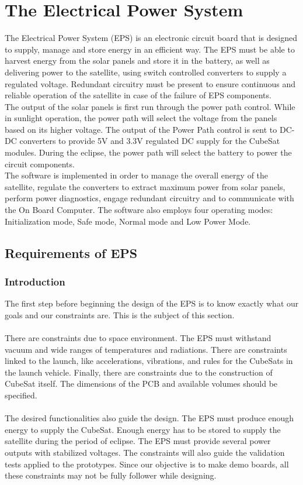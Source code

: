 \justifying
\chapter{The Electrical Power System}
The Electrical Power System (EPS) is an electronic circuit board that is designed
to supply, manage and store energy in an efficient way. The EPS must be
able to harvest energy from the solar panels and store it in the battery, as well as
delivering power to the satellite, using switch controlled converters to supply a
regulated voltage. Redundant circuitry must be present to ensure continuous and reliable operation of the satellite in case of the failure of EPS components.
\\
The output of the solar panels is first run through the power path control. While in
sunlight operation, the power path will select the voltage from the panels based on
its higher voltage. The output of the Power Path control is sent to DC-DC converters to provide 5V and 3.3V regulated DC supply for the CubeSat modules. During the eclipse, the power path will select the battery to power the circuit components.
\\
The software is implemented in order to manage the overall energy of the satellite,
regulate the converters to extract maximum power from solar panels, perform
power diagnostics, engage redundant circuitry and to communicate with the On
Board Computer. The software also employs four operating modes: Initialization
mode, Safe mode, Normal mode and Low Power Mode.
\\
\section{Requirements of EPS}

\subsection{Introduction} 

The first step before beginning the design of the EPS is to know exactly what our goals and our constraints are. This is the subject of this section.
\\ \\
There are constraints due to space environment. The EPS must withstand vacuum and wide ranges of temperatures and radiations. There are constraints linked to the launch, like accelerations, vibrations, and rules for the CubeSats in the launch vehicle. Finally, there are constraints due to the construction of CubeSat itself. The dimensions of the PCB and available volumes should be specified. 
\\ \\
The desired functionalities also guide the design. The EPS must produce enough energy to supply the CubeSat. Enough energy has to be stored to supply the satellite during the period of eclipse. The EPS must provide several power outputs with stabilized voltages. The constraints will also guide the validation tests applied to the prototypes. Since our objective is to make demo boards, all these constraints may not be fully follower while designing. 

